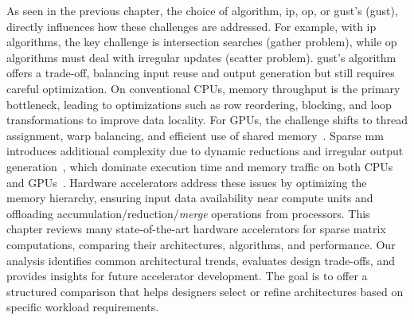 As seen in the previous chapter, the choice of algorithm, \eg \acrfull{ip}, \acrfull{op}, or \acrlong{gust}'s (\acrshort{gust}), directly influences how these challenges are addressed.
For example, with \acrshort{ip} algorithms, the key challenge is \gls{intersection} searches (\gls{gather} problem), while \acrshort{op} algorithms must deal with irregular updates (\gls{scatter} problem).
\acrlong{gust}'s algorithm offers a trade-off, balancing input reuse and output generation but still requires careful optimization.
On conventional CPUs, memory throughput is the primary bottleneck, leading to optimizations such as row reordering, blocking, and loop transformations to improve data locality.
For GPUs, the challenge shifts to thread assignment, warp balancing, and efficient use of shared memory~\cite{Liu2014}.
Sparse \acrfull{mm} introduces additional complexity due to dynamic \glspl{reduction} and irregular output generation~\cite{Gao2020}, which dominate execution time and memory traffic on both CPUs and GPUs~\cite{Zachariadis2020, Nagasaka2018, Deveci2018}.
Hardware accelerators address these issues by optimizing the memory hierarchy, ensuring input data availability near compute units and offloading accumulation/\gls{reduction}/\textit{merge} operations from processors.
This chapter reviews many state-of-the-art hardware accelerators for sparse matrix computations, comparing their architectures, algorithms, and performance.
Our analysis identifies common architectural trends, evaluates design trade-offs, and provides insights for future accelerator development.
The goal is to offer a structured comparison that helps designers select or refine architectures based on specific workload requirements.